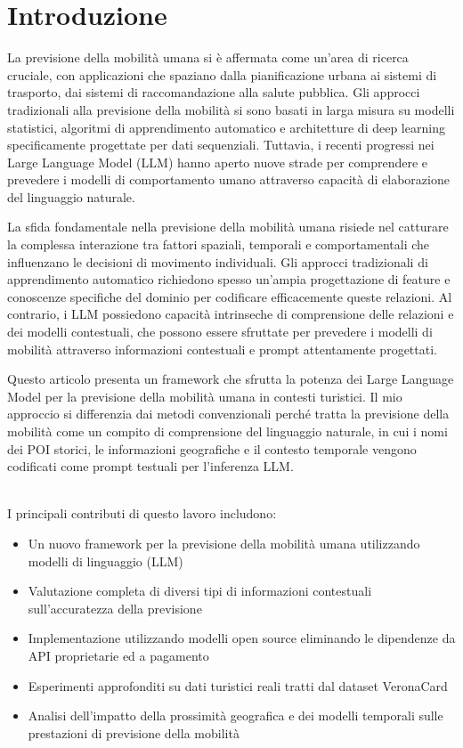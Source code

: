
\section{Introduzione}
\fancyhead{}

La previsione della mobilità umana si è affermata come un'area di ricerca cruciale, con applicazioni che spaziano dalla pianificazione urbana ai sistemi di trasporto, dai sistemi di raccomandazione alla salute pubblica. Gli approcci tradizionali alla previsione della mobilità si sono basati in larga misura su modelli statistici, algoritmi di apprendimento automatico e architetture di deep learning specificamente progettate per dati sequenziali. Tuttavia, i recenti progressi nei Large Language Model (LLM) hanno aperto nuove strade per comprendere e prevedere i modelli di comportamento umano attraverso capacità di elaborazione del linguaggio naturale.

La sfida fondamentale nella previsione della mobilità umana risiede nel catturare la complessa interazione tra fattori spaziali, temporali e comportamentali che influenzano le decisioni di movimento individuali. Gli approcci tradizionali di apprendimento automatico richiedono spesso un'ampia progettazione di feature e conoscenze specifiche del dominio per codificare efficacemente queste relazioni. Al contrario, i LLM possiedono capacità intrinseche di comprensione delle relazioni e dei modelli contestuali, che possono essere sfruttate per prevedere i modelli di mobilità attraverso informazioni contestuali e prompt attentamente progettati.

Questo articolo presenta un framework che sfrutta la potenza dei Large Language Model per la previsione della mobilità umana in contesti turistici. Il mio approccio si differenzia dai metodi convenzionali perché tratta la previsione della mobilità come un compito di comprensione del linguaggio naturale, in cui i nomi dei POI storici, le informazioni geografiche e il contesto temporale vengono codificati come prompt testuali per l'inferenza LLM.

\\
I principali contributi di questo lavoro includono:

\begin{itemize}
\item Un nuovo framework per la previsione della mobilità umana utilizzando modelli di linguaggio (LLM)
\item Valutazione completa di diversi tipi di informazioni contestuali sull'accuratezza della previsione
\item Implementazione utilizzando modelli open source eliminando le dipendenze da API proprietarie ed a pagamento
\item Esperimenti approfonditi su dati turistici reali tratti dal dataset VeronaCard
\item Analisi dell'impatto della prossimità geografica e dei modelli temporali sulle prestazioni di previsione della mobilità
\end{itemize}